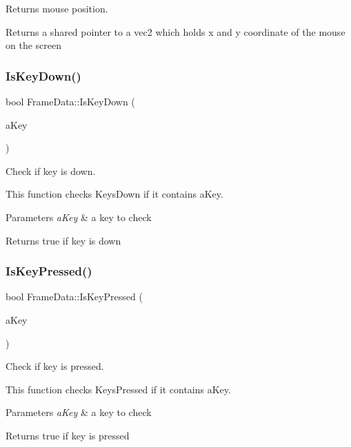 Returns mouse position. \begin{DoxyReturn}{Returns}
a shared pointer to a vec2 which holds x and y coordinate of the mouse on the screen 
\end{DoxyReturn}
\mbox{\label{class_frame_data_af88fb9f4c1769aff9607ae068974131c}} 
\subsubsection{IsKeyDown()}
{\footnotesize\ttfamily bool Frame\+Data\+::\+Is\+Key\+Down (\begin{DoxyParamCaption}\item[{S\+D\+L\+\_\+\+Keycode}]{a\+Key }\end{DoxyParamCaption})}



Check if key is down. 

This function checks Keys\+Down if it contains a\+Key. 
\begin{DoxyParams}{Parameters}
{\em a\+Key} & a key to check \\
\hline
\end{DoxyParams}
\begin{DoxyReturn}{Returns}
true if key is down 
\end{DoxyReturn}
\mbox{\label{class_frame_data_ac7f44f5453c5c50001bf8ebbe021f048}} 
\subsubsection{IsKeyPressed()}
{\footnotesize\ttfamily bool Frame\+Data\+::\+Is\+Key\+Pressed (\begin{DoxyParamCaption}\item[{S\+D\+L\+\_\+\+Keycode}]{a\+Key }\end{DoxyParamCaption})}



Check if key is pressed. 

This function checks Keys\+Pressed if it contains a\+Key. 
\begin{DoxyParams}{Parameters}
{\em a\+Key} & a key to check \\
\hline
\end{DoxyParams}
\begin{DoxyReturn}{Returns}
true if key is pressed 
\end{DoxyReturn}
\mbox{\label{class_frame_data_adb3ebfc77784082631b282abddb105eb}} 

